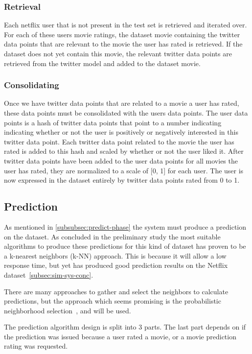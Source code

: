 \subsubsection{Retrieval}
	Each netflix user that is not present in the test set is retrieved and iterated over. For each of these users movie ratings, the dataset movie containing the twitter data points that are relevant to the movie the user has rated is retrieved. If the dataset does not yet contain this movie, the relevant twitter data points are retrieved from the twitter model and added to the dataset movie.

\subsubsection{Consolidating}
	Once we have twitter data points that are related to a movie a user has rated, these data points must be consolidated with the users data points. The user data points is a hash of twitter data points that point to a number indicating indicating whether or not the user is positively or negatively interested in this twitter data point. Each twitter data point related to the movie the user has rated is added to this hash and scaled by whether or not the user liked it. After twitter data points have been added to the user data points for all movies the user has rated, they are normalized to a scale of [0, 1] for each user. The user is now expressed in the dataset entirely by twitter data points rated from 0 to 1.

\subsection{Prediction}\label{algorithm-design:prediction}
As mentioned in \ref{subsubsec:predict-phase} the system must produce a prediction on the dataset. As concluded in the preliminary study the most suitable algorithms to produce these predictions for this kind of dataset has proven to be a k-nearest neighbors (k-NN) approach. This is because it will allow a low response time, but yet has produced good prediction results on the Netflix dataset~\ref{subsec:sim-sys-conc}.

There are many approaches to gather and select the neighbors to calculate predictions, but the approach which seems promising is the probabilistic neighborhood selection~\cite{probcobfilter}, and will be used.

The prediction algorithm design is split into 3 parts. The last part depends on if the prediction was issued because a user rated a movie, or a movie prediction rating was requested.

